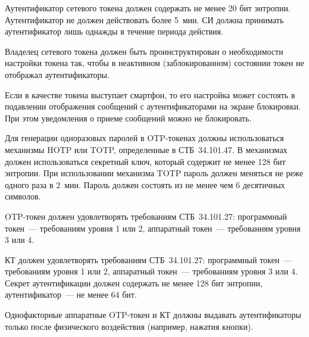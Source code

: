 Аутентификатор сетевого токена должен содержать не менее 20 бит энтропии. 
%
Аутентификатор не должен действовать более 5~мин. 
%
СИ должна принимать аутентификатор лишь однажды в течение периода действия.


Владелец сетевого токена должен быть проинструктирован о необходимости 
настройки токена так, чтобы в неактивном (заблокированном) состоянии токен не 
отображал аутентификаторы.

\begin{note*}
Если в качестве токена выступает смартфон, то его настройка может состоять в 
подавлении отображения сообщений с аутентификаторами на экране блокировки. 
При этом уведомления о приеме сообщений можно не блокировать.
\end{note*}


Для генерации одноразовых паролей в OTP-токенах должны использоваться 
механизмы HOTP или TOTP, определенные в СТБ~34.101.47. 
%
В механизмах должен использоваться секретный ключ, который содержит не менее
128 бит энтропии.
%
При использовании механизма TOTP пароль должен меняться не реже одного раза в 
2~мин.
%
Пароль должен состоять из не менее чем 6 десятичных символов.


OTP-токен должен удовлетворять требованиям СТБ~34.101.27:
программный токен~--- требованиям уровня 1 или 2,
аппаратный токен~--- требованиям уровня 3 или 4.



КТ должен удовлетворять требованиям СТБ~34.101.27:
программный токен~--- требованиям уровня 1 или 2,
аппаратный токен~--- требованиям уровня 3 или 4.
%
Секрет аутентификации должен содержать не менее 128 бит энтропии,
аутентификатор~--- не менее 64 бит.


Однофакторные аппаратные OTP-токен и КТ должны выдавать аутентификаторы 
только после физического воздействия (например, нажатия кнопки).


